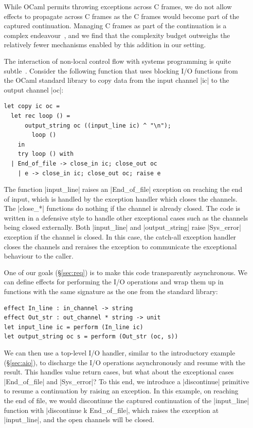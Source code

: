\documentclass[sigplan,screen]{acmart}
\begin{document}
While OCaml permits throwing exceptions across C frames, we do not allow
effects to propagate across C frames as the C frames would become part of the
captured continuation. Managing C frames as part of the continuation is a
complex endeavour~\cite{Leijen17}, and we find that the complexity budget
outweighs the relatively fewer mechanisms enabled by this addition in our
setting.

The interaction of non-local control flow with systems programming is quite
subtle~\cite{TFP17, Leijen18}. Consider the following function that uses
blocking I/O functions from the OCaml standard library to copy data from the
input channel |ic| to the output channel |oc|:
\begin{lstlisting}
let copy ic oc =
  let rec loop () =
	  output_string oc ((input_line ic) ^ "\n");
		loop ()
	in
	try loop () with
  | End_of_file -> close_in ic; close_out oc
	| e -> close_in ic; close_out oc; raise e
\end{lstlisting}
The function |input_line| raises an |End_of_file| exception on reaching the end
of input, which is handled by the exception handler which closes the channels.
The |close_*| functions do nothing if the channel is already closed. The code
is written in a defensive style to handle other exceptional cases such as the
channels being closed externally. Both |input_line| and |output_string| raise
|Sys_error| exception if the channel is closed. In this case, the catch-all
exception handler closes the channels and reraises the exception to communicate
the exceptional behaviour to the caller.

One of our goals (\S\ref{sec:req}) is to make this code transparently
asynchronous. We can define effects for performing the I/O operations and wrap
them up in functions with the same signature as the one from the standard
library:
\begin{lstlisting}
effect In_line : in_channel -> string
effect Out_str : out_channel * string -> unit
let input_line ic = perform (In_line ic)
let output_string oc s = perform (Out_str (oc, s))
\end{lstlisting}

We can then use a top-level I/O handler, similar to the introductory example
(\S\ref{sec:aio}), to discharge the I/O operations asynchronously and resume
with the result. This handles value return cases, but what about the
exceptional cases |End_of_file| and |Sys_error|? To this end, we introduce a
|discontinue| primitive to resume a continuation by raising an exception. In
this example, on reaching the end of file, we would discontinue the captured
continuation of the |input_line| function with |discontinue k End_of_file|,
which raises the exception at |input_line|, and the open channels will be
closed.
\end{document}
